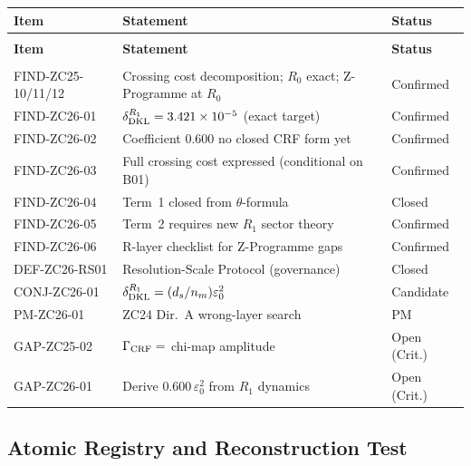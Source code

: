 \documentclass[12pt, a4paper]{article}
\begin{document}
\begin{derivedbox}[title={Z-Programme Status after TASK-ZC26}]
{\small
\setlength{\LTpre}{4pt}
\setlength{\LTpost}{4pt}
\renewcommand{\arraystretch}{1.30}
\begin{longtable}{>{\raggedright\arraybackslash}p{3.5cm}
                  >{\raggedright\arraybackslash}p{7.0cm}
                  >{\centering\arraybackslash}p{1.5cm}}
\toprule
\textbf{Item} & \textbf{Statement} & \textbf{Status} \\
\midrule
\endfirsthead
\multicolumn{3}{l}{\small\textit{(continued)}}\\[4pt]
\toprule
\textbf{Item} & \textbf{Statement} & \textbf{Status} \\
\midrule
\endhead
\midrule
\multicolumn{3}{r}{\small\textit{(continues)}}\\
\endfoot
\bottomrule
\endlastfoot
FIND-ZC25-10/11/12 & Crossing cost decomposition; $R_0$ exact;
  Z-Programme at $R_0$ & Confirmed \\
\midrule
FIND-ZC26-01 & $\delta_{\rm DKL}^{R_1} = 3.421\times10^{-5}$
  (exact target) & Confirmed \\
FIND-ZC26-02 & Coefficient $0.600$ no closed CRF form yet & Confirmed \\
FIND-ZC26-03 & Full crossing cost expressed (conditional on B01)
  & Confirmed \\
FIND-ZC26-04 & Term~1 closed from $\theta$-formula & Closed \\
FIND-ZC26-05 & Term~2 requires new $R_1$ sector theory & Confirmed \\
FIND-ZC26-06 & R-layer checklist for Z-Programme gaps & Confirmed \\
\midrule
DEF-ZC26-RS01 & Resolution-Scale Protocol (governance) & Closed \\
CONJ-ZC26-01  & $\delta_{\rm DKL}^{R_1} = (d_s/n_m)\varepsilon_0^2$
  & Candidate \\
PM-ZC26-01    & ZC24 Dir.~A wrong-layer search & PM \\
\midrule
GAP-ZC25-02   & $\Gamma_{\rm CRF}=$ chi-map amplitude & Open (Crit.) \\
GAP-ZC26-01   & Derive $0.600\,\varepsilon_0^2$ from $R_1$ dynamics
  & Open (Crit.) \\
\end{longtable}
}
\vspace{-6pt}
\end{derivedbox}

\subsection{Atomic Registry and Reconstruction Test}
\label{zc26:sec:registry}
\end{document}
